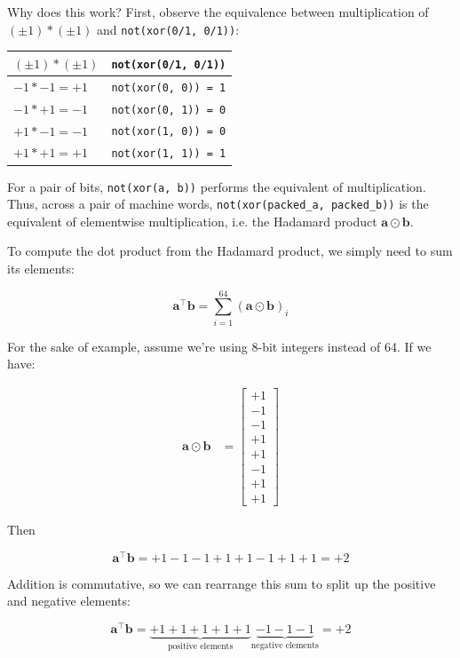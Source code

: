 \documentclass[12pt]{article}
\newcommand{\av}[0]{\mathbf{a}}
\newcommand{\bv}[0]{\mathbf{b}}
\newcommand{\transpose}[1]{#1 ^\top}
\newcommand{\dotp}[2]{\transpose{#1} #2}
\newcommand{\hadamard}[0]{\odot}
\begin{document}
Why does this work? First, observe the equivalence between multiplication of \((\pm 1) * (\pm 1)\) and \texttt{not(xor(0/1, 0/1))}:

\begin{center}
\begin{tabular}{ll}
\((\pm 1) * (\pm 1)\) & \texttt{not(xor(0/1, 0/1))}\\
\hline
\(-1 * -1 = +1\) & \texttt{not(xor(0, 0)) = 1}\\
\(-1 * +1 = -1\) & \texttt{not(xor(0, 1)) = 0}\\
\(+1 * -1 = -1\) & \texttt{not(xor(1, 0)) = 0}\\
\(+1 * +1 = +1\) & \texttt{not(xor(1, 1)) = 1}\\
\end{tabular}
\end{center}

For a pair of bits, \texttt{not(xor(a, b))} performs the equivalent of multiplication.
Thus, across a pair of machine words, \texttt{not(xor(packed\_a, packed\_b))} is the equivalent of elementwise multiplication, i.e. the Hadamard product \(\av \odot \bv\).

To compute the dot product from the Hadamard product, we simply need to sum its elements:

$$\dotp{\av}{\bv} = \sum_{i=1}^{64} (\av \odot \bv)_i$$

For the sake of example, assume we're using 8-bit integers instead of 64. If we have:

\begin{align*}
  \av \hadamard \bv &= \begin{bmatrix}
      +1\\-1\\-1\\+1\\+1\\-1\\+1\\+1
       \end{bmatrix}
\end{align*}

Then

$$\dotp{\av}{\bv} = +1 -1 -1 +1 +1 -1 +1 +1 = +2$$

Addition is commutative, so we can rearrange this sum to split up the positive and negative elements:

$$\dotp{\av}{\bv} = \underbrace{+1 +1 +1 +1 +1}_{\text{positive elements}}
\underbrace{-1 -1 -1}_{\text{negative elements}} = +2$$
\end{document}
